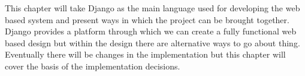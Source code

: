 \documentclass[../main.tex]{subfiles}
\begin{document}
\raggedright
This chapter will take Django as the main language used for developing the web based system and present ways in which the project can be brought together. Django provides a platform through which we can create a fully functional web based design but within the design there are alternative ways to go about thing. Eventually there will be changes in the implementation but this chapter will cover the basis of the implementation decisions. 
\end{document}
